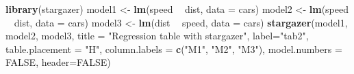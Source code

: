 \documentclass[
  12pt,
]{article}
\newenvironment{Shaded}{\begin{snugshade}}{\end{snugshade}}
\newcommand{\DataTypeTok}[1]{\textcolor[rgb]{0.13,0.29,0.53}{#1}}
\newcommand{\KeywordTok}[1]{\textcolor[rgb]{0.13,0.29,0.53}{\textbf{#1}}}
\newcommand{\NormalTok}[1]{#1}
\newcommand{\OperatorTok}[1]{\textcolor[rgb]{0.81,0.36,0.00}{\textbf{#1}}}
\newcommand{\OtherTok}[1]{\textcolor[rgb]{0.56,0.35,0.01}{#1}}
\newcommand{\StringTok}[1]{\textcolor[rgb]{0.31,0.60,0.02}{#1}}
\begin{document}
\begin{Shaded}
\begin{Highlighting}[]
\KeywordTok{library}\NormalTok{(stargazer)}
\NormalTok{model1 <-}\StringTok{ }\KeywordTok{lm}\NormalTok{(speed }\OperatorTok{~}\StringTok{ }\NormalTok{dist, }\DataTypeTok{data =}\NormalTok{ cars)}
\NormalTok{model2 <-}\StringTok{ }\KeywordTok{lm}\NormalTok{(speed }\OperatorTok{~}\StringTok{ }\NormalTok{dist, }\DataTypeTok{data =}\NormalTok{ cars)}
\NormalTok{model3 <-}\StringTok{ }\KeywordTok{lm}\NormalTok{(dist }\OperatorTok{~}\StringTok{ }\NormalTok{speed, }\DataTypeTok{data =}\NormalTok{ cars)}
\KeywordTok{stargazer}\NormalTok{(model1, model2, model3,}
          \DataTypeTok{title =} \StringTok{"Regression table with stargazer"}\NormalTok{,}
          \DataTypeTok{label=}\StringTok{"tab2"}\NormalTok{, }
          \DataTypeTok{table.placement =} \StringTok{"H"}\NormalTok{, }
          \DataTypeTok{column.labels =} \KeywordTok{c}\NormalTok{(}\StringTok{"M1"}\NormalTok{, }\StringTok{"M2"}\NormalTok{, }\StringTok{"M3"}\NormalTok{),}
          \DataTypeTok{model.numbers =} \OtherTok{FALSE}\NormalTok{,}
          \DataTypeTok{header=}\OtherTok{FALSE}\NormalTok{)}
\end{Highlighting}
\end{Shaded}
\end{document}

